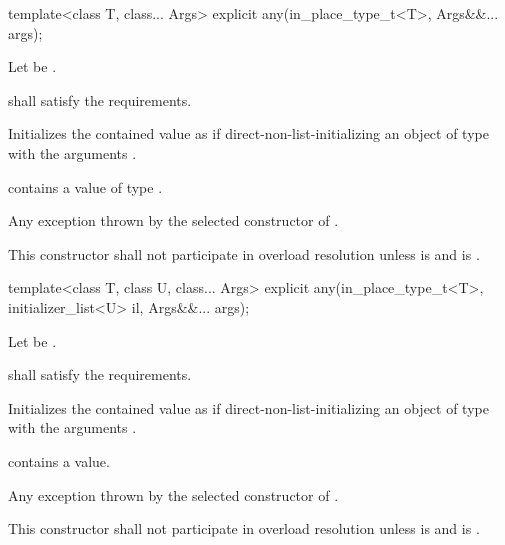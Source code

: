 %
\begin{itemdecl}
template<class T, class... Args>
  explicit any(in_place_type_t<T>, Args&&... args);
\end{itemdecl}

\begin{itemdescr}
\pnum
Let  be .

\pnum
\requires {} shall satisfy the  requirements.

\pnum
\effects Initializes the contained value as if direct-non-list-initializing an object of
type  with the arguments .

\pnum
\postconditions {} contains a value of type .

\pnum
\throws Any exception thrown by the selected constructor of .

\pnum
\remarks
This constructor shall not participate in overload resolution unless
 is  and
 is .
\end{itemdescr}

%
\begin{itemdecl}
template<class T, class U, class... Args>
  explicit any(in_place_type_t<T>, initializer_list<U> il, Args&&... args);
\end{itemdecl}

\begin{itemdescr}
\pnum
Let  be .

\pnum
\requires {} shall satisfy the  requirements.

\pnum
\effects Initializes the contained value as if direct-non-list-initializing an object of
type  with the arguments .

\pnum
\postconditions {} contains a value.

\pnum
\throws Any exception thrown by the selected constructor of .

\pnum
\remarks
This constructor shall not participate in overload resolution unless
 is  and
 is .
\end{itemdescr}

